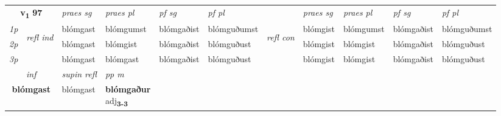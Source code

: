 \noindent
\begin{tabular}{lllllllllll} \toprule
\multicolumn{2}{c}{\textbf{v{\textsubscript{1}}} \Large{\textbf{97}}}  &  \textit{praes sg}  & \textit{praes pl}  &\textit{ pf sg} & \textit{pf pl} &  &  \textit{praes sg}  & \textit{praes pl}  & \textit{pf sg} & \textit{pf pl } \\*
	\cmidrule{3-6} \cmidrule{8-11}
 {\textit{1p}} & \multirow{3}{*}{\begin{turn}{90}\textit{refl ind}\end{turn}}  & blómgast & blómgumst & blómgaðist & blómguðumst & \multirow{3}{*}{\begin{turn}{90}\textit{refl con}\end{turn}}  &blómgist & blómgumst & blómgaðist & blómguðumst \\*
 {\textit{2p}} &  & blómgast & blómgist & blómgaðist & blómguðust & &blómgist & blómgist & blómgaðist & blómguðust \\*
 {\textit{3p}}  & & blómgast & blómgast & blómgaðist & blómguðust & & blómgist & blómgist& blómgaðist & blómguðust \\*
\cmidrule{3-6} \cmidrule{8-11}

   \multicolumn{2}{c}{\textit{inf}}       & \textit{supin refl} & \textit{pp m} \\*
  \multicolumn{2}{c}{\textbf{blómgast}}        & blómgast & \specialcell{\textbf{blómgaður} \\ adj\textbf{\textsubscript{3-3}}} \\*
\end{tabular}


